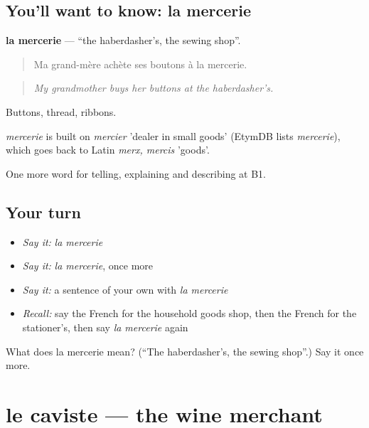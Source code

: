 \subsection*{You'll want to know: la mercerie}
\textbf{la mercerie} — \textquotedblleft{}the haberdasher’s, the sewing shop\textquotedblright{}.

\begin{quote}
Ma grand-mère achète ses boutons à la mercerie.
\end{quote}

\begin{quote}
\emph{My grandmother buys her buttons at the haberdasher's.}
\end{quote}

Buttons, thread, ribbons.

\begin{cousinweb}
\emph{mercerie} is built on \emph{mercier} 'dealer in small goods' (EtymDB lists \emph{mercerie}), which goes back to Latin \emph{merx, mercis} 'goods'.
\end{cousinweb}

\begin{grammarlens}[title={What you've built}]
One more word for telling, explaining and describing at B1.
\end{grammarlens}

\subsection*{Your turn}
\begin{itemize}
\raggedright
  \item \emph{Say it:} \emph{la mercerie}
  \item \emph{Say it:} \emph{la mercerie}, once more
  \item \emph{Say it:} a sentence of your own with \emph{la mercerie}
  \item \emph{Recall:} say the French for the household goods shop, then the French for the stationer’s, then say \emph{la mercerie} again
\end{itemize}

\begin{tcolorbox}[breakable,colback=teal!4,colframe=teal!35!black,title={Before you move on}]
What does la mercerie mean? (\textquotedblleft{}The haberdasher’s, the sewing shop\textquotedblright{}.) Say it once more.
\end{tcolorbox}
\section[le caviste]{le caviste — the wine merchant}

